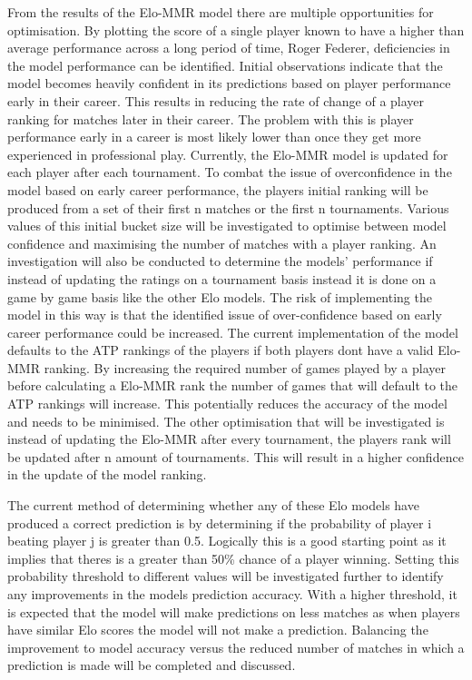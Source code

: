 \documentclass[12pt,a4paper]{article}
\begin{document}
From the results of the Elo-MMR model there are multiple opportunities for optimisation.
By plotting the score of a single player known to have a higher than average performance
across a long period of time, Roger Federer, deficiencies in the model performance can be
identified. Initial observations indicate that the model becomes heavily confident in
its predictions based on player performance early in their career. This results in reducing
the rate of change of a player ranking for matches later in their career. The problem
with this is player performance early in a career is most likely lower than once they
get more experienced in professional play. Currently, the Elo-MMR model is updated for each
player after each tournament. To combat the issue of overconfidence in the model based
on early career performance, the players initial ranking will be produced from a set of their
first n matches or the first n tournaments. Various values of this initial bucket size
will be investigated to
optimise between model confidence and maximising the number of matches with a player ranking.
An investigation will also be conducted to determine the models' performance if instead of
updating the ratings on a tournament basis instead it is done on a game by game basis
like the other Elo models. The risk of implementing the model in this way is that the
identified issue of over-confidence based on early career performance could be increased.
The current implementation of the model defaults to the ATP rankings of the players if
both players dont have a valid Elo-MMR ranking. By increasing the required number of games
played by a player before calculating a Elo-MMR rank the number of games that will default
to the ATP rankings will increase. This potentially reduces the accuracy of the model and
needs to be minimised. The other optimisation that will be investigated is instead of updating the Elo-MMR after
every tournament, the players rank will be updated after n amount of tournaments.
This will result in a higher confidence in the update of the model ranking.

The current method of determining whether any of these Elo models have produced a correct
prediction is by determining if the probability of player i beating player j is greater
than 0.5. Logically this is a good starting point as it implies that theres is a greater
than 50\% chance of a player winning. Setting this probability threshold to different values
will be investigated further to identify any improvements in the models prediction accuracy.
With a higher threshold, it is expected that the model will make predictions on less
matches as when players have similar Elo scores the model will not make a prediction.
Balancing the improvement to model accuracy versus the reduced number of matches in which
a prediction is made will be completed and discussed.
\end{document}
